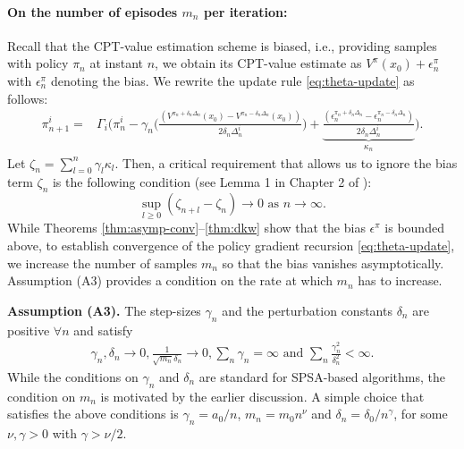 \documentclass[11pt,letterpaper,english]{article}
\begin{document}
\paragraph{On the number of episodes $m_n$ per iteration:}
Recall that the CPT-value estimation scheme is biased, i.e., providing samples with policy $\pi_n$ at instant $n$, we obtain its CPT-value estimate as $V^{\pi}(x_0) + \epsilon_n^\pi$ with $\epsilon_n^\pi$ denoting the bias. 
We rewrite the update rule \eqref{eq:theta-update} as follows:
\begin{align*}
\pi^{i}_{n+1}  = & \Gamma_{i}\bigg( \pi^{i}_n -  \gamma_n \bigg( \frac{(V^{\pi_n +\delta_n\Delta_n}(x_0) - V^{\pi_n-\delta_n\Delta_n}(x_0))}{2\delta_n\Delta_n^{i}}\bigg) + \underbrace{\frac{(\epsilon_n^{\pi_n +\delta_n\Delta_n} - \epsilon_n^{\pi_n-\delta_n\Delta_n})}{2\delta_n\Delta_n^{i}}}_{\kappa_n}\bigg).
\end{align*}
Let $\zeta_n = \sum_{l = 0}^{n} \gamma_l \kappa_{l}$. Then, a critical requirement that allows us to ignore the bias term $\zeta_n$ is the following condition (see Lemma 1 in Chapter 2 of \cite{borkar2008stochastic}): 
$$\sup_{l\ge0} \left (\zeta_{n+l} - \zeta_n \right) \rightarrow 0 \text{ as } n\rightarrow\infty.$$ 
While Theorems \ref{thm:asymp-conv}--\ref{thm:dkw} show that the bias $\epsilon^\pi$ is bounded above, to establish convergence of the policy gradient recursion \eqref{eq:theta-update}, we increase the number of samples $m_n$ so that the bias vanishes asymptotically.  Assumption (A3) provides a condition on the rate at which $m_n$ has to increase.

\noindent\textbf{Assumption (A3).}  The step-sizes $\gamma_n$ and the perturbation constants 
$\delta_n$ are positive $\forall n$ and satisfy
\begin{align*}
\gamma_n, \delta_n \rightarrow 0, \frac{1}{\sqrt{m_n}\delta_n}\rightarrow 0,  \sum_n \gamma_n=\infty \text{ and } \sum_n \frac{\gamma_n^2}{\delta_n^2}<\infty. 
\end{align*}
While the conditions on $\gamma_n$ and $\delta_n$ are standard for SPSA-based algorithms, the condition on $m_n$ is motivated by the earlier discussion. 
A simple choice that satisfies the above conditions is $\gamma_n = a_0/n$, $m_n = m_0 n^\nu$ and $\delta_n = \delta_0/{n^\gamma}$, for some $\nu, \gamma >0$ with $\gamma > \nu/2$.
\end{document}
